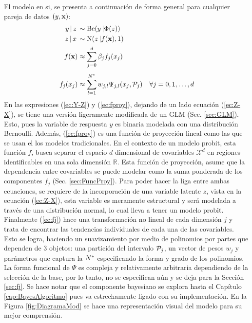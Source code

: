 \documentclass[../Main/Main.tex]{subfiles}
\begin{document}
El modelo en si, se presenta a continuación de forma general para cualquier pareja de datos $(y,\xsn)$:
\begin{align}
y\,|\,z\, &\sim \text{Be}(y\,|\Phi(z)) \label{ec:Y-Z} \\ 
z\,|\,x\, &\sim \text{N}(z\,|f(\xsn),1) \label{ec:Z-X}\\
f(\xsn) &\approx \sum_{j=0}^d \beta_j f_j(x_j) \label{ec:fproy} \\[4pt]
f_j(x_j) &\approx \sum_{l = 1}^{\N} w_{j,l} \Psi_{j,l}(x_j, \mathcal{P}_j) \quad \forall j= 0,1,\ldots,d \label{ec:fj}
\end{align}	
En las expresiones (\ref{ec:Y-Z}) y (\ref{ec:fproy}), dejando de un lado ecuación (\ref{ec:Z-X}), se tiene una versión ligeramente modificada de un GLM (Sec. \ref{sec:GLM}). Esto, pues la variable de respuesta $y$ es binaria modelada con una distribución Bernoulli. Además, (\ref{ec:fproy}) es una función de proyección lineal como las que se usan el los modelos tradicionales. En el contexto de un modelo probit, esta función $f$, busca separar el espacio $d$-dimensional de covariables $\mathcal{X}^d$ en regiones identificables en una sola dimensión $\mathbb{R}$. Esta función de proyección, asume que la dependencia entre covariables se puede modelar como la suma ponderada de los componentes $f_j$ (Sec. \ref{sec:FuncProy}). Para poder hacer la liga entre ambas ecuaciones, se requiere de la incorporación de una variable latente $z$, vista en la ecuación (\ref{ec:Z-X}), esta variable es meramente estructural y será modelada a través de una distribución normal, lo cual lleva a tener un modelo probit. Finalmente (\ref{ec:fj}) hace una transformación no lineal de cada dimensión $j$ y trata de encontrar las tendencias individuales de cada una de las covariables. Esto se logra, haciendo un suavizamiento por medio de polinomios por partes que dependen de 3 objetos: una partición del intervalo $\P_j$, un vector de pesos $w_j$ y parámetros que captura la $\N$ especificando la forma y grado de los polinomios. La forma funcional de $\Psi$ es compleja y relativamente arbitraria dependiendo de la selección de la base, por lo tanto, no se especifican aún y se deja para la Sección \ref{sec:fj}. Se hace notar que el componente bayesiano se explora hasta el Capítulo \ref{cap:BayesAlgoritmo} pues va estrechamente ligado con su implementación.  En la Figura \ref{fig:DiagramaMod} se hace una representación visual del modelo para su mejor comprensión.
\end{document}
